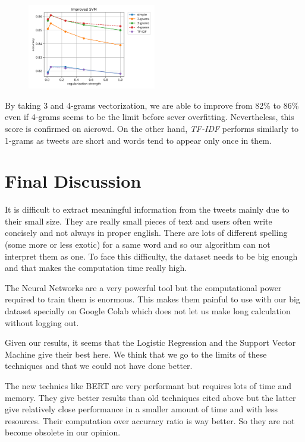\documentclass[11pt, a4paper, twocolumn]{article}
\begin{document}
\begin{figure}[h]
	\includegraphics[width=0.5\textwidth]{../plots/improved_svm.png}
\end{figure}

By taking 3 and 4-grams vectorization, we are able to improve from 82\% to 86\% even if 4-grams seems to be the limit before sever overfitting. Nevertheless, this score is confirmed on aicrowd. On the other hand, \textit{TF-IDF} performs similarly to 1-grams as tweets are short and words tend to appear only once in them.

\section{Final Discussion}
It is difficult to extract meaningful information 
from the tweets mainly due to their small size. They are really small pieces of text and users often write concisely and not always in proper english. There are lots of different spelling (some more or less exotic) for a same word 
and so our algorithm can not interpret them as one.
To face this difficulty, the dataset needs to be big enough and that makes the computation 
time really high.

The Neural Networks are a very powerful tool but the computational power required to train them 
is enormous. This makes them painful to use with our big dataset specially on Google Colab which does not let us make long calculation without logging out. 

Given our results, it seems that the Logistic Regression and the Support Vector Machine give their best here. We think that we go to the limits of these 
techniques and that we could not have done better. 

The new technics like BERT are very performant but requires lots of time and memory. They give better results than old techniques cited above but the latter give relatively close 
performance in a smaller amount of time and with less resources. Their computation over accuracy ratio is way better. So they are not become obsolete in our opinion.
\end{document}
